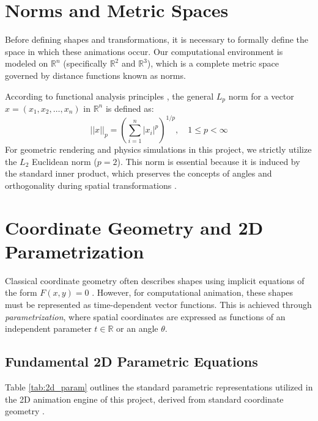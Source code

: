 \documentclass[12pt, a4paper]{report}
\begin{document}
\section{Norms and Metric Spaces}
Before defining shapes and transformations, it is necessary to formally define the space in which these animations occur. Our computational environment is modeled on $\mathbb{R}^n$ (specifically $\mathbb{R}^2$ and $\mathbb{R}^3$), which is a complete metric space governed by distance functions known as norms. 

According to functional analysis principles \cite{kreyszig1989}, the general $L_p$ norm for a vector $x = (x_1, x_2, \dots, x_n)$ in $\mathbb{R}^n$ is defined as:
\begin{equation}
    ||x||_p = \left( \sum_{i=1}^n |x_i|^p \right)^{1/p}, \quad 1 \leq p < \infty
\end{equation}
For geometric rendering and physics simulations in this project, we strictly utilize the $L_2$ Euclidean norm ($p=2$). This norm is essential because it is induced by the standard inner product, which preserves the concepts of angles and orthogonality during spatial transformations \cite{kreyszig1989}.

\section{Coordinate Geometry and 2D Parametrization}
Classical coordinate geometry often describes shapes using implicit equations of the form $F(x, y) = 0$ \cite{loney1895}. However, for computational animation, these shapes must be represented as time-dependent vector functions. This is achieved through \textit{parametrization}, where spatial coordinates are expressed as functions of an independent parameter $t \in \mathbb{R}$ or an angle $\theta$.

\subsection{Fundamental 2D Parametric Equations}
Table \ref{tab:2d_param} outlines the standard parametric representations utilized in the 2D animation engine of this project, derived from standard coordinate geometry \cite{loney1895}.
\end{document}
